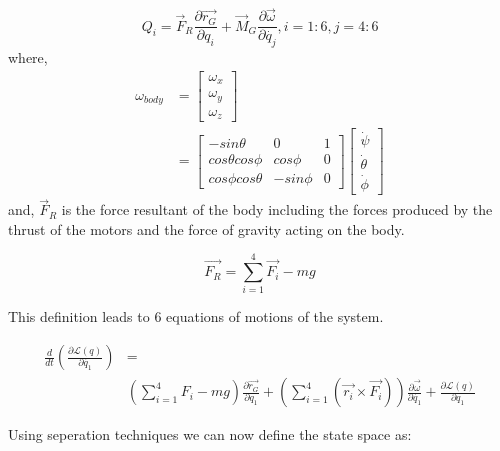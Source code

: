 \documentclass[twoside,twocolumn]{article}
\begin{document}
\begin{equation}
Q_{i}=\overrightarrow{F}_{R}\frac{\partial\overrightarrow{r_{G}}}{\partial q_{i}}+\overrightarrow{M}_{G}\frac{\partial\overrightarrow{\omega}}{\partial\dot{q_{j}}}, i=1:6, j=4:6
\end{equation}
where,
\begin{equation}
\begin{split}
\omega_{body}&=\left[\begin{array}{c}
\omega_{x}\\
\omega_{y}\\
\omega_{z}
\end{array}\right] \\
&=\left[\begin{array}{ccc}
-sin\theta & 0 & 1\\
cos\theta cos\phi & cos\phi & 0\\
cos\phi cos\theta & -sin\phi & 0
\end{array}\right]\left[\begin{array}{c}
\dot{\psi}\\
\dot{\theta}\\
\dot{\phi}
\end{array}\right]
\end{split}
\end{equation}
and, $\overrightarrow{F}_{R}$ is the force resultant of the body including the forces produced by the thrust of the motors and the force of gravity acting on the body.

\begin{equation}
\overrightarrow{F_{R}}=\sum_{i=1}^{4}\overrightarrow{F_{i}}-mg
\end{equation}

This definition leads to 6 equations of motions of the system.

\begin{equation}
\begin{split}
\frac{d}{dt}(\frac{\partial\mathcal{L}(q)}{\partial\dot{q_{1}}})&= \\
&(\sum_{i=1}^{4}F_{i} - mg)\frac{\partial\overrightarrow{r_{G}}}{\partial q_{1}}+(\sum_{i=1}^{4}(\overrightarrow{r_{i}}\times\overrightarrow{F_{i}}))\frac{\partial\overrightarrow{\omega}}{\partial\dot{q_{1}}} + \frac{\partial\mathcal{L}(q)}{\partial q_{1}}
\end{split}
\end{equation}

Using seperation techniques we can now define the state space as:
\end{document}
